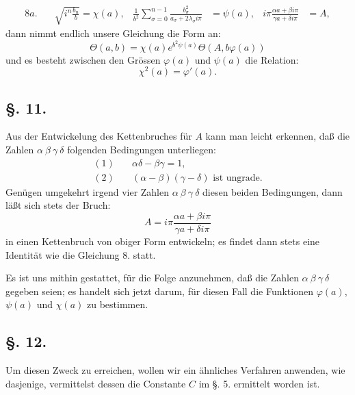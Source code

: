 \documentclass[10pt]{article}
\begin{document}
\begin{align*}
8a.\quad&\sqrt{i^{n}\frac{b_n}{b}}=\chi(a),&
\frac{1}{b^{2}}\sum_{\sigma=0}^{n-1}\frac{b_\sigma^{2}}{a_\sigma+2\lambda_\sigma i\pi}&=\psi(a),&
 i\pi\frac{\alpha a+\beta i\pi}{\gamma a+\delta i\pi}&=A,
\end{align*}
dann nimmt endlich unsere Gleichung die Form an:
\begin{equation*}
\Theta(a,b)=\chi(a)e^{b^{2}\psi(a)}\Theta(A,b\varphi(a))
\tag{8b.}
\end{equation*}
und es besteht zwischen den Grössen \(\varphi(a)\) und \(\psi(a)\) die Relation:
\begin{equation*}
\chi^{2}(a)=\varphi'(a).
\tag{9.}
\end{equation*}

\subsection*{\S. 11.}
Aus der Entwickelung des Kettenbruches für \(A\) kann man leicht erkennen, daß die Zahlen \(\alpha\ \beta\ \gamma\ \delta\) folgenden Bedingungen unterliegen:
\begin{align*}
(1)\quad&\alpha\delta-\beta\gamma=1,\\
(2)\quad&(\alpha-\beta)(\gamma-\delta)\text{ ist ungrade.}
\end{align*}
Genügen umgekehrt irgend vier Zahlen \(\alpha\ \beta\ \gamma\ \delta\) diesen beiden Bedingungen, dann läßt sich stets der Bruch:
\[
A=i\pi\frac{\alpha a+\beta i\pi}{\gamma a+\delta i\pi}
\]
in einen Kettenbruch von obiger Form entwickeln; es findet dann stets eine Identität wie die Gleichung 8. statt.

Es ist uns mithin gestattet, für die Folge anzunehmen, daß die Zahlen \(\alpha\ \beta\ \gamma\ \delta\) gegeben seien; es handelt sich jetzt darum, für diesen Fall die Funktionen \(\varphi(a)\), \(\psi(a)\) und \(\chi(a)\) zu bestimmen.

\subsection*{\S. 12.}
Um diesen Zweck zu erreichen, wollen wir ein ähnliches Verfahren anwenden, wie dasjenige, vermittelst dessen die Constante \(C\) im \S. 5. ermittelt worden ist.
\end{document}
